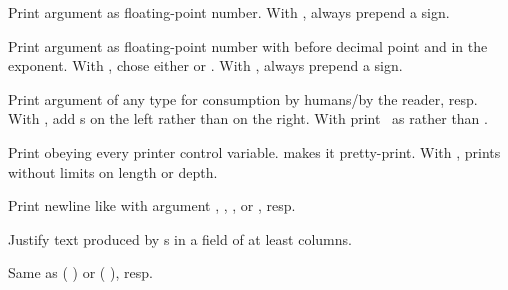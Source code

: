 \begin{LIST}{1cm}
\begin{LIST}{.5cm}
    Print argument as floating-point number. With , always prepend a sign.

    Print argument as floating-point number with 
    before decimal point and  in the
    exponent. With , chose either  or . With , always prepend a sign.

    Print argument of any type for consumption by humans/by the
    reader, resp. With , add s on the left
    rather than on the right. With \kwd{:} print \NIL\ as \LIT{()} rather
    than .

    Print obeying every printer control variable. \kwd{:} makes it
    pretty-print. With , prints without limits on length or depth.

    Print newline like  with argument
    , , , or , resp.

    Justify text produced by s in a field of at least
     columns.

    Same as (  ) or
    (  ), resp.


\end{LIST}
\end{LIST}
